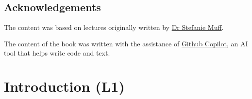 \documentclass[
  letterpaper,
  8pt,
  a4paper]{book}
\begin{document}
\section*{Acknowledgements}\label{acknowledgements}


The content was based on lectures originally written by
\href{https://www.ntnu.edu/employees/stefanie.muff}{Dr Stefanie Muff}.

The content of the book was written with the assistance of
\href{https://copilot.github.com/}{Github Copilot}, an AI tool that
helps write code and text.


\chapter*{Introduction (L1)}\label{introduction-l1}

\end{document}
